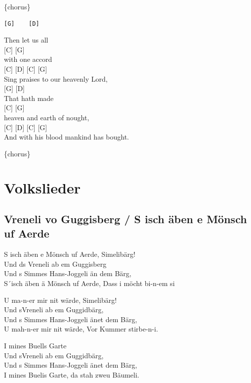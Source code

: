 \documentclass[
  letterpaper,
]{scrbook}
\begin{document}
\{chorus\}

\begin{verbatim}
[G]    [D] 
\end{verbatim}

Then let us all\\
{[}C{]} {[}G{]}\\
with one accord\\
{[}C{]} {[}D{]} {[}C{]} {[}G{]}\\
Sing praises to our heavenly Lord,\\
{[}G{]} {[}D{]}\\
That hath made\\
{[}C{]} {[}G{]}\\
heaven and earth of nought,\\
{[}C{]} {[}D{]} {[}C{]} {[}G{]}\\
And with his blood mankind has bought.

\{chorus\}

\part{Volkslieder}

\hypertarget{vreneli-vo-guggisberg-s-isch-uxe4ben-e-muxf6nsch-uf-aerde}{%
\chapter{Vreneli vo Guggisberg / S isch äben e Mönsch uf
Aerde}\label{vreneli-vo-guggisberg-s-isch-uxe4ben-e-muxf6nsch-uf-aerde}}

S isch äben e Mönsch uf Aerde, Simelibärg!\\
Und ds Vreneli ab em Guggisberg\\
Und s Simmes Hans-Joggeli än dem Bärg,\\
S´isch äben ä Mönsch uf Aerde, Dass i möcht bi-n-em si

U ma-n-er mir nit wärde, Simelibärg!\\
Und s\textquotesingle Vreneli ab em Guggidbärg,\\
Und s\textquotesingle{} Simmes Hans-Joggeli änet dem Bärg,\\
U mah-n-er mir nit wärde, Vor Kummer stirbe-n-i.

I mines Buells Garte\\
Und s\textquotesingle Vreneli ab em Guggidbärg,\\
Und s\textquotesingle{} Simmes Hans-Joggeli änet dem Bärg,\\
I mines Buelis Garte, da stah zweu Bäumeli.
\end{document}
